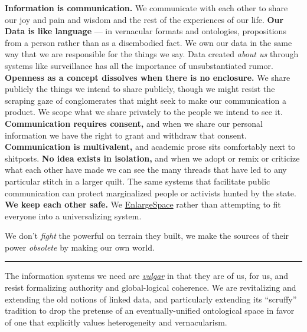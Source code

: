\textbf{Information is communication.} We communicate with each other to
share our joy and pain and wisdom and the rest of the experiences of our
life. \textbf{Our Data is like language} --- in vernacular formats and
ontologies, propositions from a person rather than as a disembodied
fact. We own our data in the same way that we are responsible for the
things we say. Data created \emph{about us} through systems like
surveillance has all the importance of unsubstantiated rumor.
\textbf{Openness as a concept dissolves when there is no enclosure.} We
share publicly the things we intend to share publicly, though we might
resist the scraping gaze of conglomerates that might seek to make our
communication a product. We scope what we share privately to the people
we intend to see it. \textbf{Communication requires consent,} and when
we share our personal information we have the right to grant and
withdraw that consent. \textbf{Communication is multivalent,} and
academic prose sits comfortably next to shitposts. \textbf{No idea
exists in isolation,} and when we adopt or remix or criticize what each
other have made we can see the many threads that have led to any
particular stitch in a larger quilt. The same systems that facilitate
public communication can protect marginalized people or activists hunted
by the state. \textbf{We keep each other safe.} We
\href{http://meatballwiki.org/wiki/EnlargeSpace}{EnlargeSpace} \cite{MeatballWikiEnlargeSpace}  rather than attempting to fit everyone
into a universalizing system.

We don't \emph{fight} the powerful on terrain they built, we make the
sources of their power \emph{obsolete} by making our own world.

\begin{center}\rule{0.5\linewidth}{0.5pt}\end{center}

The information systems we need are
\href{https://www.etymonline.com/search?q=vulgar}{\emph{vulgar}} \cite{harperVulgar}  in that they are of us, for us, and resist
formalizing authority and global-logical coherence. We are revitalizing
and extending the old notions of linked data, and particularly extending
its ``scruffy'' tradition \cite{poirierTurnScruffyEthnographic2017}  to drop the pretense of an eventually-unified ontological space in
favor of one that explicitly values heterogeneity and vernacularism.

